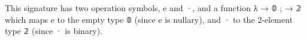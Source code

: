 \documentclass[a4paper,UKenglish,cleveref,autoref,thm-restate]{lipics-v2021}
\begin{document}
\begin{code}%
\>[0][@{}l@{\AgdaIndent{0}}]%
\>[1]\AgdaSpace{}%
\AgdaSpace{}%
\AgdaSymbol{:}\AgdaSpace{}%
\AgdaSpace{}%
\AgdaSpace{}%
\<%
\\
\>[1][@{}l@{\AgdaIndent{0}}]%
\>[2]\AgdaSpace{}%
\AgdaSymbol{:}\AgdaSpace{}%
\<%
\\
%
\>[2]\AgdaSpace{}%
\AgdaSymbol{:}\AgdaSpace{}%
\<%
\\
%
\\[\AgdaEmptyExtraSkip]%
%
\>[1]\AgdaSpace{}%
\AgdaSymbol{:}\AgdaSpace{}%
\AgdaSpace{}%
\AgdaSpace{}%
\<%
\\
%
\>[1]\AgdaSpace{}%
\AgdaSymbol{=}\AgdaSpace{}%
\AgdaSpace{}%
\AgdaOperator{\AgdaInductiveConstructor{,}}\AgdaSpace{}%
\AgdaSpace{}%
\AgdaSymbol{\{}\AgdaSpace{}%
\AgdaSpace{}%
\AgdaSpace{}%
\AgdaSymbol{;}\AgdaSpace{}%
\AgdaSpace{}%
\AgdaSpace{}%
\AgdaSpace{}%
\AgdaSymbol{\}}\<%
\end{code}
\ccpad
This signature has two operation symbols, \aic e and \aic ·, and a function \as λ \as{\{}  \as → \af 𝟘 \as ;  \as → \af 𝟚 \as{\}} which maps \aic e to the empty type \af 𝟘 (since \aic e is nullary), and \aic · to the 2-element type \af 𝟚 (since \aic · is binary).








\newcommand\sigOV{\AgdaFunction{Signature}\AgdaSpace{}\AgdaBound{𝓞}\AgdaSpace{}\AgdaBound{𝓥}\xspace}
\end{document}
